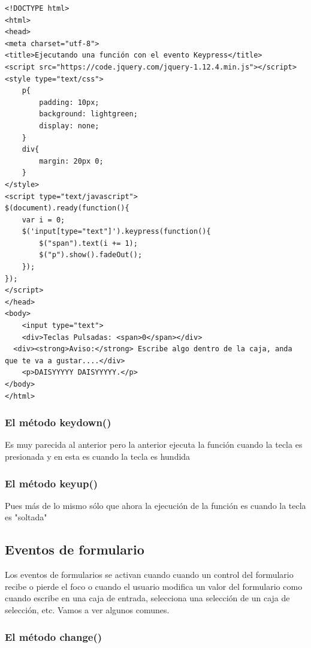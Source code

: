 \documentclass[a4paper, oneside]{article}
\begin{document}
\begin{verbatim}
<!DOCTYPE html>
<html>
<head>
<meta charset="utf-8">
<title>Ejecutando una función con el evento Keypress</title>
<script src="https://code.jquery.com/jquery-1.12.4.min.js"></script>
<style type="text/css">
    p{
        padding: 10px;
        background: lightgreen;
        display: none;
    }
    div{
        margin: 20px 0;
    }
</style>
<script type="text/javascript">
$(document).ready(function(){
    var i = 0;
    $('input[type="text"]').keypress(function(){
        $("span").text(i += 1);
        $("p").show().fadeOut();
    });
});
</script>
</head>
<body>
    <input type="text">
    <div>Teclas Pulsadas: <span>0</span></div>
  <div><strong>Aviso:</strong> Escribe algo dentro de la caja, anda que te va a gustar....</div>
    <p>DAISYYYYY DAISYYYYY.</p>
</body>
</html>                                		
\end{verbatim}


\subsubsection{El método keydown()}
\label{sec:org28a59d6}

Es muy parecida al anterior pero la anterior ejecuta la función cuando la tecla es presionada y en esta es cuando la tecla es hundida

\subsubsection{El método keyup()}
\label{sec:orgf1a5967}

Pues más de lo mismo sólo que ahora la ejecución de la función es cuando la tecla es "soltada"


\subsection{Eventos de formulario}
\label{sec:orgcfe9344}

Los eventos de formularios se activan cuando cuando un control del formulario recibe o pierde el foco o cuando el usuario modifica un valor del formulario como cuando escribe en una caja de entrada, selecciona una selección de un caja de selección, etc. Vamos a ver algunos comunes.

\subsubsection{El método change()}
\label{sec:org6f3d1ef}
\end{document}
